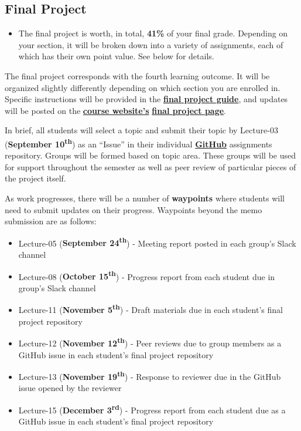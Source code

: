 \documentclass[]{book}
\providecommand{\tightlist}{%
  \setlength{\itemsep}{0pt}\setlength{\parskip}{0pt}}
\newenvironment{rmdblock}[1]
  {\begin{shaded*}
  \begin{itemize}
  \renewcommand{\labelitemi}{
    \raisebox{-.7\height}[0pt][0pt]{
      {\setkeys{Gin}{width=3em,keepaspectratio}\texttt{[image: images/\#1]}}
    }
  }
  \item
  }
  {
  \end{itemize}
  \end{shaded*}
  }
\newenvironment{rmdtip}
  {\begin{rmdblock}{tip}}
  {\end{rmdblock}}
\theoremstyle{definition}
\theoremstyle{definition}
\theoremstyle{definition}
\theoremstyle{remark}
\begin{document}
\subsection{Final Project}\label{final-project}

\begin{rmdtip}
The final project is worth, in total, \textbf{41\%} of your final grade.
Depending on your section, it will be broken down into a variety of
assignments, each of which has their own point value. See below for
details.
\end{rmdtip}

The final project corresponds with the fourth learning outcome. It will
be organized slightly differently depending on which section you are
enrolled in. Specific instructions will be provided in the
\href{https://slu-soc5050.github.io/finalGuide}{\textbf{final project
guide}}, and updates will be posted on the
\href{https://slu-soc5050.github.io/}{\textbf{course website's}}
\href{https://slu-soc5050.github.io/final-project}{\textbf{final project
page}}.

In brief, all students will select a topic and submit their topic by
Lecture-03 (\textbf{September 10\textsuperscript{th}}) as an ``Issue''
in their individual
\href{https://github.com/slu-soc5650}{\textbf{GitHub}} assignments
repository. Groups will be formed based on topic area. These groups will
be used for support throughout the semester as well as peer review of
particular pieces of the project itself.

As work progresses, there will be a number of \textbf{waypoints} where
students will need to submit updates on their progress. Waypoints beyond
the memo submission are as follows:

\begin{itemize}
\tightlist
\item
  Lecture-05 (\textbf{September 24\textsuperscript{th}}) - Meeting
  report posted in each group's Slack channel
\item
  Lecture-08 (\textbf{October 15\textsuperscript{th}}) - Progress report
  from each student due in group's Slack channel
\item
  Lecture-11 (\textbf{November 5\textsuperscript{th}}) - Draft materials
  due in each student's final project repository
\item
  Lecture-12 (\textbf{November 12\textsuperscript{th}}) - Peer reviews
  due to group members as a GitHub issue in each student's final project
  repository
\item
  Lecture-13 (\textbf{November 19\textsuperscript{th}}) - Response to
  reviewer due in the GitHub issue opened by the reviewer
\item
  Lecture-15 (\textbf{December 3\textsuperscript{rd}}) - Progress report
  from each student due as a GitHub issue in each student's final
  project repository
\end{itemize}
\end{document}
